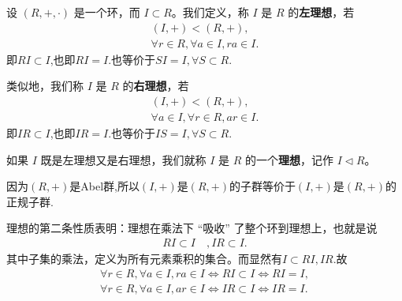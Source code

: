 \documentclass[../../main.tex]{subfiles}
\begin{document}
\begin{definition}[理想]
设 $(R, +, \cdot)$ 是一个环，而 $I \subset R$。我们定义，称 $I$ 是 $R$ 的\textbf{左理想}，若
\begin{gather*}
(I, +) < (R, +),\\
\forall r \in R, \forall a \in I, ra \in I.
\end{gather*}
即$RI\subset I$,也即$RI=I.$也等价于$SI=I,\forall S\subset R$.

类似地，我们称 $I$ 是 $R$ 的\textbf{右理想}，若
\begin{gather*}
(I, +) < (R, +),\\
\forall a \in I, \forall r \in R, ar \in I.
\end{gather*}
即$IR\subset I$,也即$IR=I.$也等价于$IS=I,\forall S\subset R$.

如果 $I$ 既是左理想又是右理想，我们就称 $I$ 是 $R$ 的一个\textbf{理想}，记作 $I \lhd R$。 
\end{definition}
\begin{remark}
因为$(R,+)$是Abel群,所以$(I,+)是(R,+)$的子群等价于$(I,+)$是$(R,+)$的正规子群.
\end{remark}
\begin{note}
理想的第二条性质表明：理想在乘法下 “吸收” 了整个环到理想上，也就是说
\begin{align*}
RI \subset I\quad ,
IR \subset I.
\end{align*}
其中子集的乘法，定义为所有元素乘积的集合。而显然有$I\subset RI,IR$.故
\begin{gather*}
\forall r\in R,\forall a\in I,ra\in I\Leftrightarrow RI\subset I\Leftrightarrow RI=I,
\\
\forall r\in R,\forall a\in I,ar\in I\Leftrightarrow IR\subset I\Leftrightarrow IR=I.
\end{gather*}
\end{note}
\end{document}
